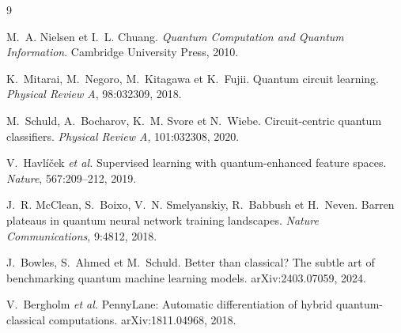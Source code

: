 \documentclass[11pt,a4paper]{article}
\begin{document}
\begin{thebibliography}{9}

M.~A. Nielsen et I.~L. Chuang.
\newblock \emph{Quantum Computation and Quantum Information}.
\newblock Cambridge University Press, 2010.

K.~Mitarai, M.~Negoro, M.~Kitagawa et K.~Fujii.
\newblock Quantum circuit learning.
\newblock \emph{Physical Review A}, 98:032309, 2018.

M.~Schuld, A.~Bocharov, K.~M. Svore et N.~Wiebe.
\newblock Circuit-centric quantum classifiers.
\newblock \emph{Physical Review A}, 101:032308, 2020.

V.~Havlíček \emph{et al.}
\newblock Supervised learning with quantum-enhanced feature spaces.
\newblock \emph{Nature}, 567:209--212, 2019.

J.~R. McClean, S.~Boixo, V.~N. Smelyanskiy, R.~Babbush et H.~Neven.
\newblock Barren plateaus in quantum neural network training landscapes.
\newblock \emph{Nature Communications}, 9:4812, 2018.

J.~Bowles, S.~Ahmed et M.~Schuld.
\newblock Better than classical? The subtle art of benchmarking quantum machine learning models.
\newblock arXiv:2403.07059, 2024.

V.~Bergholm \emph{et al.}
\newblock PennyLane: Automatic differentiation of hybrid quantum-classical computations.
\newblock arXiv:1811.04968, 2018.

\end{thebibliography}
\end{document}
